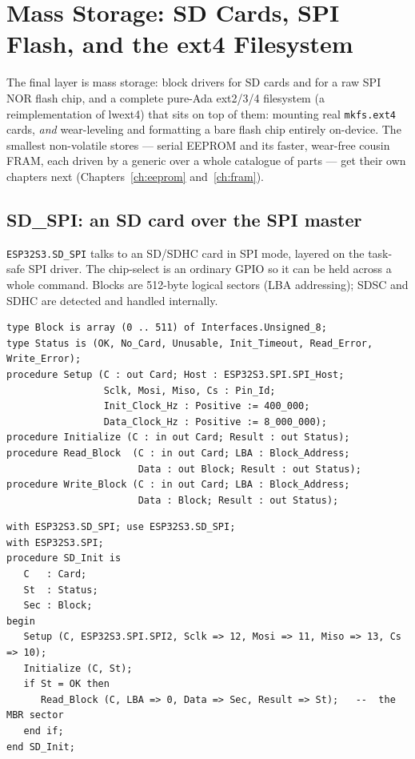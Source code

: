 \chapter[Mass Storage: SD Cards, SPI Flash, ext4]%
        {Mass Storage: SD Cards, SPI Flash, and the ext4 Filesystem}
\label{ch:storage}

The final layer is mass storage: block drivers for SD cards and for a raw SPI NOR
flash chip, and a complete pure-Ada ext2/3/4 filesystem (a reimplementation of
lwext4) that sits on top of them: mounting real \texttt{mkfs.ext4} cards,
\emph{and} wear-leveling and formatting a bare flash chip entirely on-device. The
smallest non-volatile stores --- serial EEPROM and its faster, wear-free cousin
FRAM, each driven by a generic over a whole catalogue of parts --- get their own
chapters next (Chapters~\ref{ch:eeprom} and~\ref{ch:fram}).

\section{SD\_SPI: an SD card over the SPI master}

\texttt{ESP32S3.SD\_SPI} talks to an SD/SDHC card in SPI mode, layered on the
task-safe SPI driver. The chip-select is an ordinary GPIO so it can be held across
a whole command. Blocks are 512-byte logical sectors (LBA addressing); SDSC and
SDHC are detected and handled internally.

\begin{lstlisting}
type Block is array (0 .. 511) of Interfaces.Unsigned_8;
type Status is (OK, No_Card, Unusable, Init_Timeout, Read_Error, Write_Error);
procedure Setup (C : out Card; Host : ESP32S3.SPI.SPI_Host;
                 Sclk, Mosi, Miso, Cs : Pin_Id;
                 Init_Clock_Hz : Positive := 400_000;
                 Data_Clock_Hz : Positive := 8_000_000);
procedure Initialize (C : in out Card; Result : out Status);
procedure Read_Block  (C : in out Card; LBA : Block_Address;
                       Data : out Block; Result : out Status);
procedure Write_Block (C : in out Card; LBA : Block_Address;
                       Data : Block; Result : out Status);
\end{lstlisting}

\begin{lstlisting}
with ESP32S3.SD_SPI; use ESP32S3.SD_SPI;
with ESP32S3.SPI;
procedure SD_Init is
   C   : Card;
   St  : Status;
   Sec : Block;
begin
   Setup (C, ESP32S3.SPI.SPI2, Sclk => 12, Mosi => 11, Miso => 13, Cs => 10);
   Initialize (C, St);
   if St = OK then
      Read_Block (C, LBA => 0, Data => Sec, Result => St);   --  the MBR sector
   end if;
end SD_Init;
\end{lstlisting}

